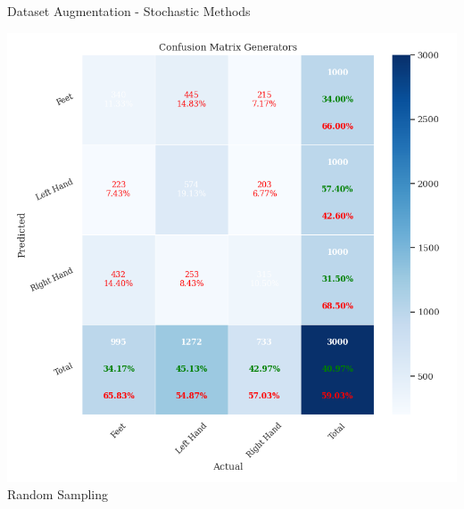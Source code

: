 \begin{frame}{Dataset Augmentation - Stochastic Methods}
\begin{minipage}[c]{.33\textwidth}
            \includegraphics[width=.8\textwidth]{figures/augmentation/stochastic/confusion_matrix_generators_2024_03_30_18_01_19_random_sampler_using_LSTMNet_0.5943600867678959.pkl.png}
            {\tiny Random Sampling}
    \end{minipage}
\end{frame}

